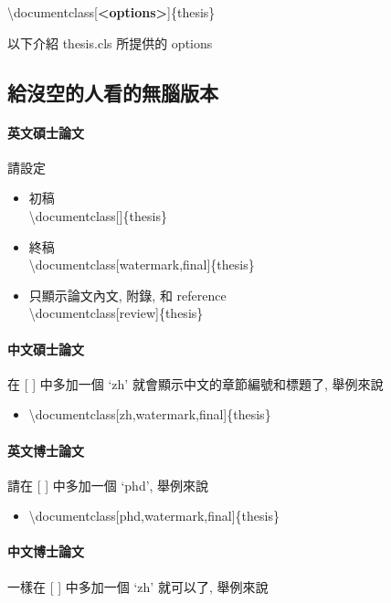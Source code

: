 \textbackslash documentclass[\textbf{<options>}]\{thesis\}

以下介紹 thesis.cls 所提供的 options

\newpage

\subsection{給沒空的人看的無腦版本}

\paragraph{英文碩士論文} 請設定

\begin{itemize}
\item 初稿\\
\textbackslash documentclass[]\{thesis\}
\item 終稿\\
\textbackslash documentclass[watermark,final]\{thesis\}
\item 只顯示論文內文, 附錄, 和 reference\\
\textbackslash documentclass[review]\{thesis\}
\end{itemize}

\paragraph{中文碩士論文} 在 [ ] 中多加一個 `zh' 就會顯示中文的章節編號和標題了, 舉例來說

\begin{itemize}
\item \textbackslash documentclass[zh,watermark,final]\{thesis\}
\end{itemize}


\paragraph{英文博士論文} 請在 [ ] 中多加一個 `phd', 舉例來說

\begin{itemize}
\item \textbackslash documentclass[phd,watermark,final]\{thesis\}
\end{itemize}

\paragraph{中文博士論文} 一樣在 [ ] 中多加一個 `zh' 就可以了, 舉例來說

